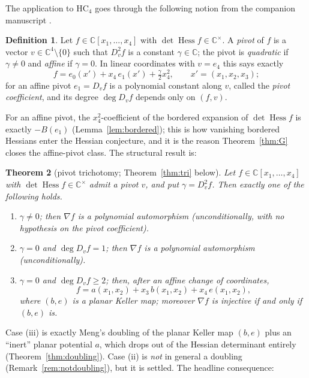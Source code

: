 \documentclass[11pt]{article}
\theoremstyle{plain}
\newtheorem{theorem}{Theorem}[section]
\theoremstyle{definition}
\newtheorem{definition}[theorem]{Definition}
\newcommand{\C}{\mathbb{C}}
\newcommand{\Hess}{\operatorname{Hess}}
\newcommand{\HC}{\mathrm{HC}}
\begin{document}
The application to $\HC_4$ goes through the following notion from the
companion manuscript \cite{companion}.

\begin{definition}\label{def:pivot}
Let $f\in\C[x_1,\dots,x_4]$ with $\det\Hess f\in\C^{\times}$. A
\emph{pivot} of $f$ is a vector $v\in\C^4\setminus\{0\}$ such that
$D_v^2f$ is a constant $\gamma\in\C$; the pivot is \emph{quadratic} if
$\gamma\ne0$ and \emph{affine} if $\gamma=0$. In linear coordinates with
$v=e_4$ this says exactly
\[
f=e_0(x')+x_4\,e_1(x')+\tfrac\gamma2x_4^2,\qquad x'=(x_1,x_2,x_3);
\]
for an affine pivot $e_1=D_vf$ is a polynomial constant along $v$, called
the \emph{pivot coefficient}, and its degree $\deg D_vf$ depends only on
$(f,v)$.
\end{definition}

For an affine pivot, the $x_4^2$-coefficient of the bordered expansion of
$\det\Hess f$ is exactly $-B(e_1)$ (Lemma~\ref{lem:bordered}); this is how
vanishing bordered Hessians enter the Hessian conjecture, and it is the
reason Theorem~\ref{thm:G} closes the affine-pivot class. The structural
result is:

\begin{theorem}[pivot trichotomy; Theorem~\ref{thm:tri} below]
Let $f\in\C[x_1,\dots,x_4]$ with $\det\Hess f\in\C^{\times}$ admit a
pivot $v$, and put $\gamma=D_v^2f$. Then exactly one of the following
holds.
\begin{enumerate}
\item[\rm(i)] $\gamma\ne0$; then $\nabla f$ is a polynomial automorphism
(unconditionally, with no hypothesis on the pivot coefficient).
\item[\rm(ii)] $\gamma=0$ and $\deg D_vf=1$; then $\nabla f$ is a
polynomial automorphism (unconditionally).
\item[\rm(iii)] $\gamma=0$ and $\deg D_vf\ge2$; then, after an affine
change of coordinates,
\[
f=a(x_1,x_2)+x_3\,b(x_1,x_2)+x_4\,e(x_1,x_2),
\]
where $(b,e)$ is a planar Keller map; moreover $\nabla f$ is injective if
and only if $(b,e)$ is.
\end{enumerate}
\end{theorem}

Case (iii) is exactly Meng's doubling of the planar Keller map $(b,e)$
\cite{Meng2006,MengYang} plus an ``inert'' planar potential $a$, which
drops out of the Hessian determinant entirely
(Theorem~\ref{thm:doubling}). Case (ii) is \emph{not} in general a
doubling (Remark~\ref{rem:notdoubling}), but it is settled. The headline
consequence:
\end{document}
